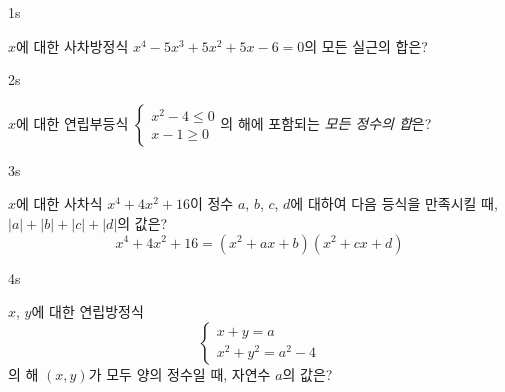 \documentclass[10pt]{article}
\begin{document}


\begin{pagepair}

\begin{problem}{1}{s}
\par\smallskip
$x$에 대한 사차방정식 $x^4 - 5x^3 + 5x^2 + 5x - 6 = 0$의 모든 실근의 합은?
\begin{choices}
\end{choices}
\end{problem}

\begin{problem}{2}{s}
\par\smallskip
$x$에 대한 연립부등식 $\begin{cases} x^2 - 4 \le 0 \\ x - 1 \ge 0 \end{cases}$의 해에 포함되는 \emph{모든 정수의 합}은?
\begin{choices}
\end{choices}
\end{problem}

\end{pagepair}

\begin{pagepair}

\begin{problem}{3}{s}
\par\smallskip
$x$에 대한 사차식 $x^4 + 4x^2 + 16$이 정수 $a$, $b$, $c$, $d$에 대하여 다음 등식을 만족시킬 때, $|a| + |b| + |c| + |d|$의 값은?
$$x^4 + 4x^2 + 16 = (x^2 + ax + b)(x^2 + cx + d)$$
\begin{choices}
\end{choices}
\end{problem}

\begin{problem}{4}{s}
\par\smallskip
$x$, $y$에 대한 연립방정식
$$\begin{cases} x + y = a \\ x^2 + y^2 = a^2 - 4 \end{cases}$$
의 해 $(x, y)$가 모두 양의 정수일 때, 자연수 $a$의 값은?
\begin{choices}
\end{choices}
\end{problem}

\end{pagepair}
\end{document}
